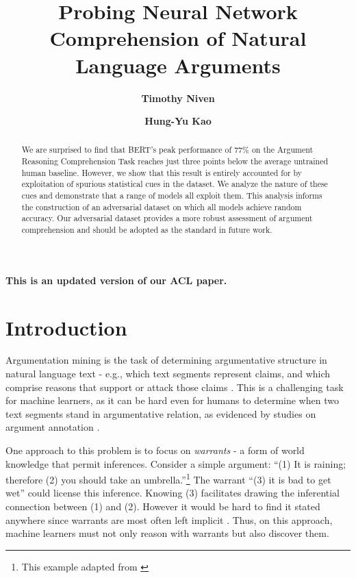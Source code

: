 \documentclass[11pt,a4paper]{article}
\title{Probing Neural Network Comprehension of Natural Language Arguments}
\author{\textbf{Timothy Niven}}
\author{\textbf{Hung-Yu Kao}}
\affil{Intelligent Knowledge Management Lab \\
  Department of Computer Science and Information Engineering \\
  National Cheng Kung University \\
  Tainan, Taiwan \\
  \texttt{tim.niven.public@gmail.com}, \texttt{hykao@mail.ncku.edu.tw}}
\date{}
\begin{document}
\maketitle
\begin{abstract}
  We are surprised to find that BERT's peak performance of 77\% on the Argument Reasoning Comprehension Task reaches just three points below the average untrained human baseline. However, we show that this result is entirely accounted for by exploitation of spurious statistical cues in the dataset. We analyze the nature of these cues and demonstrate that a range of models all exploit them. This analysis informs the construction of an adversarial dataset on which all models achieve random accuracy. Our adversarial dataset provides a more robust assessment of argument comprehension and should be adopted as the standard in future work.
\end{abstract}

\noindent
\textbf{This is an updated version of our ACL paper.}

\section{Introduction}

Argumentation mining is the task of determining argumentative structure in natural language text - e.g., which text segments represent claims, and which comprise reasons that support or attack those claims \cite{MochalesM11, LippiT16}. This is a challenging task for machine learners, as it can be hard even for humans to determine when two text segments stand in argumentative relation, as evidenced by studies on argument annotation \cite{HabernalEG14}.

One approach to this problem is to focus on \textit{warrants} \cite{Toulmin58} - a form of world knowledge that permit inferences. Consider a simple argument: ``(1) It is raining; therefore (2) you should take an umbrella.''\footnote{This example adapted from \citeauthor{BlackH12} } The warrant ``(3) it is bad to get wet'' could license this inference. Knowing (3) facilitates drawing the inferential connection between (1) and (2). However it would be hard to find it stated anywhere since warrants are most often left implicit \cite{Walton05}. Thus, on this approach, machine learners must not only reason with warrants but also discover them.
\end{document}
